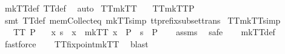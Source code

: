 \begin{isabellebody}
\ mkTT{}{\isacharunderscore}def\ TT{}{\isacharunderscore}def\ \isamarkupfalse%
\ auto%
\endisatagproof
{\isafoldproof}%
%
\isadelimproof
\isanewline
%
\endisadelimproof
\isanewline
{}\isamarkupfalse%
\ TT{}{\isacharunderscore}mkTT{}{\isacharcolon}\isanewline
\ \ \ {\isachardoublequoteopen}TT{}{\isacharparenleft}mkTT{}{\isacharparenleft}P{\isacharparenright}{\isacharparenright}{\isachardoublequoteclose}\isanewline
%
\isadelimproof
\ \ %
\endisadelimproof
%
\isatagproof
{}\isamarkupfalse%
\ {\isacharparenleft}smt\ TT{}{\isacharunderscore}def\ mem{\isacharunderscore}Collect{\isacharunderscore}eq\ mkTT{}{\isacharunderscore}simp\ tt{\isacharunderscore}prefix{\isacharunderscore}subset{\isacharunderscore}trans{\isacharparenright}%
\endisatagproof
{\isafoldproof}%
%
\isadelimproof
\isanewline
%
\endisadelimproof
\isanewline
{}\isamarkupfalse%
\ TT{}{\isacharunderscore}mkTT{}{\isacharunderscore}simp{\isacharcolon}\isanewline
\ \ \ {\isachardoublequoteopen}TT{}\ P{\isachardoublequoteclose}\isanewline
\ \ \ {\isachardoublequoteopen}{\isacharparenleft}{\isasymexists}x{\isachardot}\ s\ {\isasymin}\ x\ {\isasymand}\ {\isacharparenleft}mkTT{}\ x{\isacharparenright}\ {\isasymsubseteq}\ P{\isacharparenright}\ {\isacharequal}\ {\isacharparenleft}s\ {\isasymin}\ P{\isacharparenright}{\isachardoublequoteclose}\isanewline
%
\isadelimproof
\ \ %
\endisadelimproof
%
\isatagproof
{}\isamarkupfalse%
\ assms\ \isamarkupfalse%
\ safe\isanewline
\ \ \isamarkupfalse%
\ mkTT{}{\isacharunderscore}def\ \isamarkupfalse%
\ fastforce\isanewline
\ \ \isamarkupfalse%
\ TT{}{\isacharunderscore}fixpoint{\isacharunderscore}mkTT{}\ \isamarkupfalse%
\ blast%
\endisatagproof
{\isafoldproof}%
%
\isadelimproof
%
\endisadelimproof
%
\end{isabellebody}
